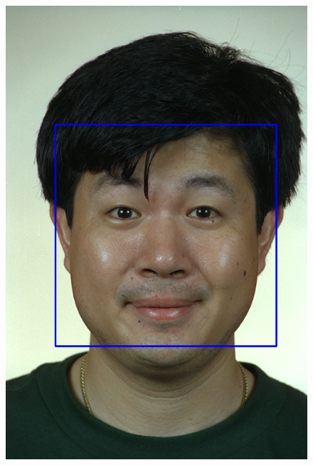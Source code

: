 \begin{figure}[h!]
\begin{minipage}[b]{0.33\textwidth}
        \includegraphics[width=0.9\linewidth]{fig/02_face.png}
        \label{fig:face}
    \end{minipage}\hfill\begin{minipage}[b]{0.33\textwidth}
        \centering

\end{minipage}
\end{figure}

